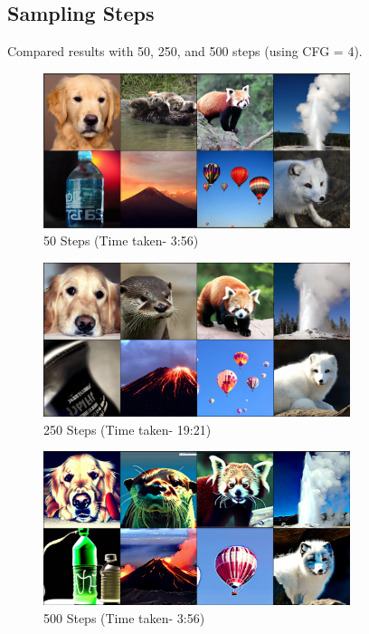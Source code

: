 \documentclass{article}
\begin{document}
\subsection{Sampling Steps}
Compared results with 50, 250, and 500 steps (using CFG = 4).
\begin{figure}[h] %
    \centering
    \includegraphics[width=0.8\textwidth]{images/image-50-steps.png} %
    \caption{50 Steps (Time taken- 3:56)}
    \label{fig:cfg5} %
\end{figure}
\begin{figure}[h] %
    \centering
    \includegraphics[width=0.8\textwidth]{images/image-250-steps.png} %
    \caption{250 Steps (Time taken- 19:21)}
    \label{fig:cfg5} %
\end{figure}
\begin{figure} %
    \centering
    \includegraphics[width=0.8\textwidth]{images/image1.png} %
    \caption{500 Steps (Time taken- 3:56)}
    \label{fig:cfg5} %
\end{figure}
\end{document}
